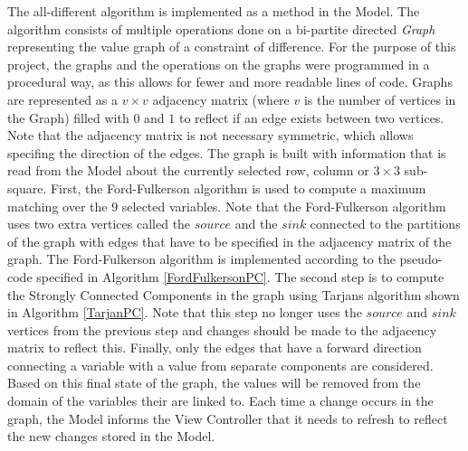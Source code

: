 \documentclass{l4proj}
\begin{document}
\noindent The all-different algorithm is implemented as a method in the Model. The algorithm consists of multiple operations done on a bi-partite directed \textit{Graph} representing the value graph of a constraint of difference. For the purpose of this project, the graphs and the operations on the graphs were programmed in a procedural way, as this allows for fewer and more readable lines of code. Graphs are represented as a $v \times v$ adjacency matrix (where $v$ is the number of vertices in the Graph) filled with $0$ and $1$ to reflect if an edge exists between two vertices. Note that the adjacency matrix is not necessary symmetric, which allows specifing the direction of the edges. The graph is built with information that is read from the Model about the currently selected row, column or $3 \times 3$ sub-square. First, the Ford-Fulkerson algorithm  \cite{ford1956maximal} is used to compute a maximum matching over the $9$ selected variables. Note that the Ford-Fulkerson algorithm uses two extra vertices called the $source$ and the $sink$ connected to the partitions of the graph with edges that have to be specified in the adjacency matrix of the graph. The Ford-Fulkerson algorithm is implemented according to the pseudo-code specified in Algorithm \ref{FordFulkersonPC}. The second step is to compute the Strongly Connected Components in the graph using Tarjan\textquotesingle s algorithm \cite{tarjan1972depth} shown in Algorithm \ref{TarjanPC}. Note that this step no longer uses the $source$ and $sink$ vertices from the previous step and changes should be made to the  adjacency matrix to reflect this. Finally, only the edges that have a forward direction connecting a variable with a value from separate components are considered. Based on this final state of the graph, the values will be removed from the domain of the variables their are linked to. Each time a change occurs in the graph, the Model informs the View Controller that it needs to refresh to reflect the new changes stored in the Model.
\end{document}
